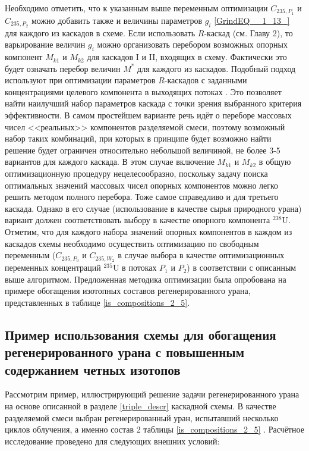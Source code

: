 Необходимо отметить, что к указанным выше переменным оптимизации $C_{235,{P_1}}$ и $C_{235,{P_2}}$ можно добавить также и величины параметров $g_{i}$  \ref{GrindEQ__1_13_} для каждого из каскадов в схеме. Если использовать $R$-каскад (см. Главу 2), то варьирование величин $g_{i}$ можно организовать перебором возможных опорных компонент $M_{k1}$ и $M_{k2}$ для каскадов I и II, входящих в схему. Фактически это будет означать перебор величин $M^{*}$ для каждого из каскадов. Подобный подход используют при оптимизации параметров $R$-каскадов с заданными концентрациями целевого компонента в выходящих потоках \cite{songComparativeStudyModel2010, sulaberidzeSravnenieOptimalnyhModelnyh2008}. Это позволяет найти наилучший набор параметров каскада с точки зрения выбранного критерия эффективности. В самом простейшем варианте речь идёт о переборе массовых чисел <<реальных>> компонентов разделяемой смеси, поэтому возможный набор таких комбинаций, при которых в принципе будет возможно найти решение будет ограничен относительно небольшой величиной, не более 3-5 вариантов для каждого каскада. В этом случае включение $M_{k1}$ и $M_{k2}$ в общую оптимизационную процедуру нецелесообразно, поскольку задачу поиска оптимальных значений массовых чисел опорных компонентов можно легко решить методом полного перебора. Тоже самое справедливо и для третьего каскада.
Однако в его случае (использование в качестве сырья природного урана) вариант должен соответствовать выбору в качестве опорного компонента $^{238}$U. Отметим, что для каждого набора значений опорных компонентов в каждом из каскадов схемы необходимо осуществить оптимизацию по свободным переменным ($C_{235,P_0}$ и $C_{235,W_2}$ в случае выбора в качестве оптимизационных переменных концентраций $^{235}$U в потоках $P_1$ и $P_2$) в соответствии с описанным выше алгоритмом. 
Предложенная методика оптимизации была опробована на примере обогащения изотопных составов регенерированного урана, представленных в таблице \ref{is_compositions_2_5}.


\subsection{Пример использования схемы для обогащения регенерированного урана с повышенным содержанием четных изотопов}\label{example_trip}

Рассмотрим пример, иллюстрирующий решение задачи регенерированного урана на основе описанной в разделе \ref{triple_descr} каскадной схемы. В качестве разделяемой смеси выбран регенерированный уран, испытавший несколько циклов облучения, а именно состав 2 таблицы \ref{is_compositions_2_5} \cite{smirnovObogashchenieRegenerirovannogoUrana2018}. Расчётное исследование проведено для следующих внешних условий:

